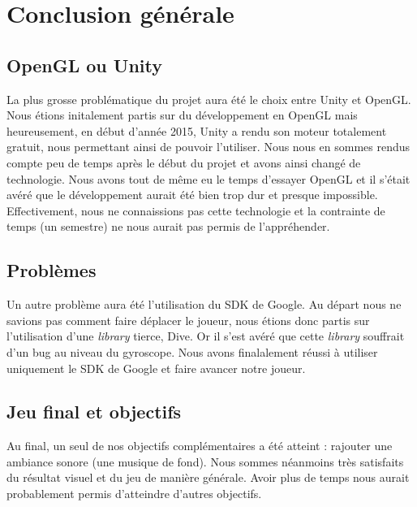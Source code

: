 \chapter{Conclusion générale}

\section{OpenGL ou Unity}

La plus grosse problématique du projet aura été le choix entre Unity et OpenGL. Nous étions initalement partis sur du développement en OpenGL mais heureusement, en début d'année 2015, Unity a rendu son moteur totalement gratuit, nous permettant ainsi de pouvoir l'utiliser. Nous nous en sommes rendus compte peu de temps après le début du projet et avons ainsi changé de technologie. Nous avons tout de même eu le temps d'essayer OpenGL et il s'était avéré que le développement aurait été bien trop dur et presque impossible. Effectivement, nous ne connaissions pas cette technologie et la contrainte de temps (un semestre) ne nous aurait pas permis de l'appréhender.

\section{Problèmes}

Un autre problème aura été l'utilisation du SDK de Google. Au départ nous ne savions pas comment faire déplacer le joueur, nous étions donc partis sur l'utilisation d'une \textit{library} tierce, Dive. Or il s'est avéré que cette \textit{library} souffrait d'un bug au niveau du gyroscope. Nous avons finalalement réussi à utiliser uniquement le SDK de Google et faire avancer notre joueur.

\section{Jeu final et objectifs}

Au final, un seul de nos objectifs complémentaires a été atteint : rajouter une ambiance sonore (une musique de fond). Nous sommes néanmoins très satisfaits du résultat visuel et du jeu de manière générale. Avoir plus de temps nous aurait probablement permis d'atteindre d'autres objectifs.